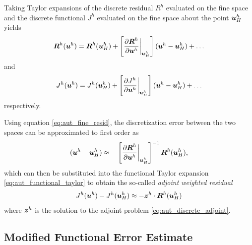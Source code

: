Taking Taylor expansions of the discrete residual $R^h$ evaluated on the
fine space and the discrete functional $J^h$ evaluated on the fine space
about the point $\boldsymbol{u}^h_H$ yields
%
\begin{gather}
\boldsymbol{R}^h(\boldsymbol{u}^h) = \boldsymbol{R}^h(\boldsymbol{u}^h_H) +
\left[ 
\frac{ \partial \boldsymbol{R}^h }{ \partial \boldsymbol{u}^h} \biggr|_{\boldsymbol{u}^h_H}
\right]
(\boldsymbol{u}^h - \boldsymbol{u}^h_H) + \dots
\label{eq:aut_residual_taylor}
\end{gather}
%
and
%
%
\begin{gather}
J^h(\boldsymbol{u}^h) = J^h(\boldsymbol{u}^h_H) +
\left[
\frac{ \partial J^h } { \partial \boldsymbol{u}^h} \biggr|_{\boldsymbol{u}^h_H}
\right]
(\boldsymbol{u}^h - \boldsymbol{u}^h_H) + \dots
\label{eq:aut_functional_taylor}
\end{gather}
%
respectively.

Using equation \eqref{eq:aut_fine_resid}, the discretization error
between the two spaces can be approximated to first order as
%
\begin{gather}
(\boldsymbol{u}^h - \boldsymbol{u}^h_H) \approx
- \left[
\frac{ \partial \boldsymbol{R}^h } { \partial \boldsymbol{u}^h } \biggr|_{\boldsymbol{u}^h_H}
\right]^{-1}
\boldsymbol{R}^h (\boldsymbol{u}^h_H ),
\label{eq:aut_disc_error_approx}
\end{gather}
%
which can then be substituted into the functional Taylor expansion
\eqref{eq:aut_functional_taylor} to obtain the so-called
\emph{adjoint weighted residual}
%
\begin{gather}
J^h(\boldsymbol{u}^h) - J^h(\boldsymbol{u}^h_H) \approx  - \boldsymbol{z}^h \cdot \boldsymbol{R}^h(\boldsymbol{u}^h_H)
\label{eq:aut_adjoint_weighted_residual}
\end{gather}
%
where $\boldsymbol{z}^h$ is the solution to the adjoint problem
\eqref{eq:aut_discrete_adjoint}.

\subsection{Modified Functional Error Estimate}

